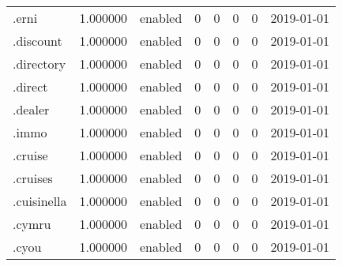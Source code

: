 \begin{tabular}{lrlrrrrl}
.erni                     &          1.000000 &         enabled &                           0 &                           0 &                           0 &                   0 &           2019-01-01 \\
.discount                 &          1.000000 &         enabled &                           0 &                           0 &                           0 &                   0 &           2019-01-01 \\
.directory                &          1.000000 &         enabled &                           0 &                           0 &                           0 &                   0 &           2019-01-01 \\
.direct                   &          1.000000 &         enabled &                           0 &                           0 &                           0 &                   0 &           2019-01-01 \\
.dealer                   &          1.000000 &         enabled &                           0 &                           0 &                           0 &                   0 &           2019-01-01 \\
.immo                     &          1.000000 &         enabled &                           0 &                           0 &                           0 &                   0 &           2019-01-01 \\
.cruise                   &          1.000000 &         enabled &                           0 &                           0 &                           0 &                   0 &           2019-01-01 \\
.cruises                  &          1.000000 &         enabled &                           0 &                           0 &                           0 &                   0 &           2019-01-01 \\
.cuisinella               &          1.000000 &         enabled &                           0 &                           0 &                           0 &                   0 &           2019-01-01 \\
.cymru                    &          1.000000 &         enabled &                           0 &                           0 &                           0 &                   0 &           2019-01-01 \\
.cyou                     &          1.000000 &         enabled &                           0 &                           0 &                           0 &                   0 &           2019-01-01 \\

\end{tabular}
